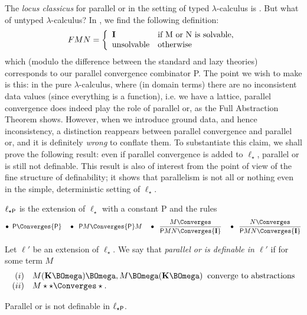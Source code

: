 The {\it locus classicus} for parallel or in the setting of typed $\lambda$-calculus is \cite{Plo77}. 
But what of untyped $\lambda$-calculus? 
In \cite[p.\  375]{Bar}, we find the following definition: 
\[ F M N = \left\{ \begin{array}{ll}
{\bf I} & \mbox{if {\mit M} or {\mit N} is solvable,} \\
{\rm unsolvable} & \mbox{otherwise}
\end{array}
\right. \]
which (modulo the difference between the standard and lazy theories) corresponds to our parallel convergence combinator {\sf P}. 
The point we wish to make is this: in the pure $\lambda$-calculus, where (in domain terms) there are no inconsistent data values 
(since everything is a function), i.e. we have a lattice, 
parallel convergence does indeed play the role of parallel or, as the Full Abstraction Theorem shows. 
However, when we introduce ground data, and hence inconsistency, a distinction reappears between parallel convergence and parallel or, 
and it is definitely {\em wrong} to conflate them. 
To substantiate this claim, we shall prove the following result: even if parallel convergence is added to $\ell_{\star}$, parallel or is still not definable. 
This result is also of interest from the point of view of the fine structure of definability; 
it shows that parallelism is not all or nothing even in the simple, deterministic setting of $\ell_{\star}$.

\begin{definition}
{\rm $\ell_{\star {\sf P}}$ is the extension of $\ell_{\star}$ with a constant {\sf P} and the rules}
\[ \bullet \;\; {\sf P} \Converges {\sf P} \;\;\;\;
\bullet \;\; {\sf P} M \Converges {\sf P} M \;\;\;\;
\bullet \;\; \frac{M \Converges}{{\sf P} M N \Converges {\bf I}} \;\;\;\; 
\bullet \;\; \frac{N \Converges}{{\sf P} M N \Converges {\bf I}} \]
\end{definition}

\begin{definition}
{\rm Let $\ell'$ be an extension of $\ell_{\star}$. 
We say that {\em parallel or is definable in $\ell'$} if for some term $M$
\[ \begin{array}{rl}
(i) & M ({\bf K} \BOmega ) \BOmega ,  M \BOmega ({\bf K} \BOmega ) \;\; 
\mbox{converge to abstractions} \\
(ii) & M \star \star \Converges \star .
\end{array} \] }
\end{definition}

\begin{theorem}
Parallel or is not definable in $\ell_{\star {\sf P}}$.
\end{theorem}

